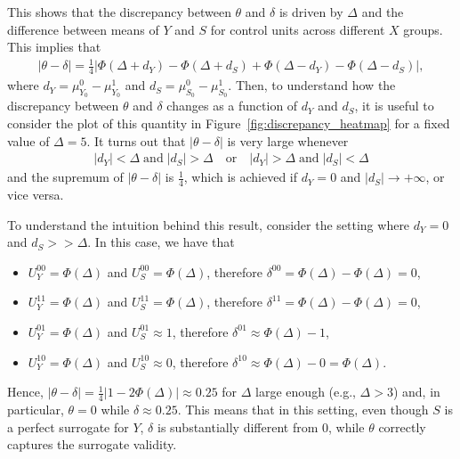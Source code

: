 \documentclass[12pt]{article}
\begin{document}
This shows that the discrepancy between \(\theta\) and \(\delta\) is driven by \(\Delta\) and the difference between means of \(Y\) and \(S\) for control units across different \(X\) groups. This implies that
\begin{align}
    |\theta - \delta| = \frac{1}{4} | \Phi(\Delta + d_{Y}) - \Phi(\Delta + d_{S}) + \Phi(\Delta - d_{Y}) - \Phi(\Delta - d_{S}) |,
\end{align}
where \(d_{Y} = \mu^{0}_{Y_{0}} - \mu^{1}_{Y_{0}}\) and \(d_{S} = \mu^{0}_{S_{0}} - \mu^{1}_{S_{0}}\). Then, to understand how the discrepancy between \(\theta\) and \(\delta\) changes as a function of \(d_{Y}\) and \(d_{S}\), it is useful to consider the plot of this quantity in Figure~\ref{fig:discrepancy_heatmap} for a fixed value of \(\Delta = 5\). It turns out that \(|\theta - \delta|\) is very large whenever
\begin{align}
    |d_{Y}| < \Delta \; \text{and} \; |d_{S}| > \Delta \quad \text{or} \quad |d_{Y}| > \Delta \; \text{and} \; |d_{S}| < \Delta
\end{align}
and the supremum of \(|\theta - \delta|\) is \(\frac{1}{4}\), which is achieved if \(d_{Y} = 0\) and \( | d_{S} | \to +\infty\), or vice versa. %

To understand the intuition behind this result, consider the setting where \(d_{Y} = 0\) and \(d_{S} >> \Delta\). In this case, we have that
\begin{itemize}
    \item \(U^{00}_{Y} = \Phi (\Delta)\) and \(U^{00}_{S} = \Phi (\Delta)\), therefore \(\delta^{00} = \Phi (\Delta) - \Phi (\Delta) = 0\),
    \item \(U^{11}_{Y} = \Phi (\Delta)\) and \(U^{11}_{S} = \Phi (\Delta)\), therefore \(\delta^{11} = \Phi (\Delta) - \Phi (\Delta) = 0\),
    \item \(U^{01}_{Y} = \Phi (\Delta)\) and \(U^{01}_{S} \approx 1\), therefore \(\delta^{01} \approx \Phi (\Delta) - 1 \),
    \item \(U^{10}_{Y} = \Phi (\Delta)\) and \(U^{10}_{S} \approx 0\), therefore \(\delta^{10} \approx \Phi (\Delta) - 0 = \Phi (\Delta)\).
\end{itemize}
Hence, \(|\theta - \delta| = \frac{1}{4} | 1 - 2 \Phi (\Delta)| \approx 0.25\) for \(\Delta\) large enough (e.g., \(\Delta > 3\)) and, in particular, \(\theta = 0\) while \(\delta \approx 0.25\). This means that in this setting, even though \(S\) is a perfect surrogate for \(Y\), \(\delta\) is substantially different from \(0\), while \(\theta\) correctly captures the surrogate validity.
\end{document}
